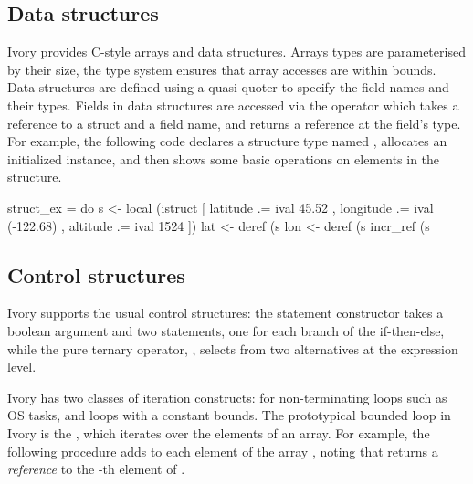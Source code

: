 \subsection{Data structures}

Ivory provides C-style arrays and data structures.  Arrays types are
parameterised by their size, the type system ensures that array accesses
are within bounds.  Data structures are defined using a quasi-quoter
to specify the field names and their types.  Fields in data structures
are accessed via the \cd{\mytilde>} operator which takes a
reference to a struct and a field name, and returns a reference at the
field's type. For example, the following code declares a structure
type named , allocates an initialized instance, and then
shows some basic operations on elements in the structure.

\begin{code}
struct_ex = do
  s <- local (istruct [ latitude  .= ival 45.52
                      , longitude .= ival (-122.68)
                      , altitude  .= ival 1524 ])
  lat <- deref (s %
  lon <- deref (s %
  incr_ref (s %
\end{code}

\subsection{Control structures}
\label{sec:control}

Ivory supports the usual control structures: the  statement
constructor takes a boolean argument and two statements, one for each
branch of the if-then-else, while the pure ternary operator, ,
selects from two alternatives at the expression level.

Ivory has two classes of iteration constructs:  for non-terminating
loops such as OS tasks, and loops with a constant bounds. The prototypical
bounded loop in Ivory is the , which iterates over the elements of
an array. For example, the following
procedure adds  to each element of the array , noting
that  returns a \emph{reference} to the -th
element of .

